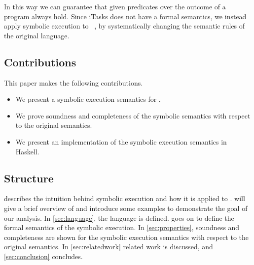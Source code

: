 In this way we can guarantee that given predicates over the outcome of a \TOP program always hold.
Since iTasks does not have a formal semantics, we instead apply symbolic execution to \TOPHAT~\cite{Steenvoorden2019}, by systematically changing the semantic rules of the original language.



\subsection{Contributions}

This paper makes the following contributions.

\begin{itemize}
  \item We present a symbolic execution semantics for \TOPHAT.
  \item We prove soundness and completeness of the symbolic semantics with respect to the original \TOPHAT semantics.
  \item We present an implementation of the symbolic execution semantics in Haskell.
\end{itemize}



\subsection{Structure}

 describes the intuition behind symbolic execution and how it is applied to \TOPHAT.
 will give a brief overview of \TOPHAT and introduce some examples to demonstrate the goal of our analysis.
In \cref{sec:language}, the \TOPHAT language is defined.
 goes on to define the formal semantics of the symbolic execution.
In \cref{sec:properties}, soundness and completeness are shown for the symbolic execution semantics with respect to the original \TOPHAT semantics.
In \cref{sec:relatedwork} related work is discussed, and \cref{sec:conclusion} concludes.
